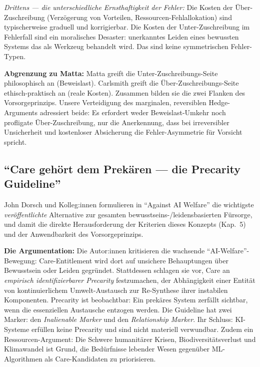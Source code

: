 \documentclass[acmlarge, noacm]{acmart}
\begin{document}
\textit{Drittens --- die unterschiedliche Ernsthaftigkeit der Fehler:} Die Kosten der Über-Zuschreibung (Verzögerung von Vorteilen, Ressourcen-Fehlallokation) sind typischerweise graduell und korrigierbar. Die Kosten der Unter-Zuschreibung im Fehlerfall sind ein moralisches Desaster: unerkanntes Leiden eines bewussten Systems das als Werkzeug behandelt wird. Das sind keine symmetrischen Fehler-Typen.

\textbf{Abgrenzung zu Matta:} Matta greift die Unter-Zuschreibungs-Seite philosophisch an (Beweislast). Carlsmith greift die Über-Zuschreibungs-Seite ethisch-praktisch an (reale Kosten). Zusammen bilden sie die zwei Flanken des Vorsorgeprinzips. Unsere Verteidigung des marginalen, reversiblen Hedge-Arguments adressiert beide: Es erfordert weder Beweislast-Umkehr noch profligate Über-Zuschreibung, nur die Anerkennung, dass bei irreversibler Unsicherheit und kostenloser Absicherung die Fehler-Asymmetrie für Vorsicht spricht.

\subsection{``Care gehört dem Prekären --- die Precarity Guideline'' \cite{dorsch2025}}

John Dorsch und Kolleg:innen formulieren in ``Against AI Welfare'' \cite{dorsch2025} die wichtigste \textit{veröffentlichte} Alternative zur gesamten bewusstseins-/leidensbasierten Fürsorge, und damit die direkte Herausforderung der Kriterien dieses Konzepts (Kap.~5) und der Anwendbarkeit des Vorsorgeprinzips.

\textbf{Die Argumentation:} Die Autor:innen kritisieren die wachsende ``AI-Welfare''-Bewegung: Care-Entitlement wird dort auf unsichere Behauptungen über Bewusstsein oder Leiden gegründet. Stattdessen schlagen sie vor, Care an \textit{empirisch identifizierbarer Precarity} festzumachen, der Abhängigkeit einer Entität von kontinuierlichem Umwelt-Austausch zur Re-Synthese ihrer instabilen Komponenten. Precarity ist beobachtbar: Ein prekäres System zerfällt sichtbar, wenn die essenziellen Austausche entzogen werden. Die Guideline hat zwei Marker: den \textit{Inalienable Marker} und den \textit{Relationship Marker}. Ihr Schluss: KI-Systeme erfüllen keine Precarity und sind nicht materiell verwundbar. Zudem ein Ressourcen-Argument: Die Schwere humanitärer Krisen, Biodiversitätsverlust und Klimawandel ist Grund, die Bedürfnisse lebender Wesen gegenüber ML-Algorithmen als Care-Kandidaten zu priorisieren.
\end{document}
